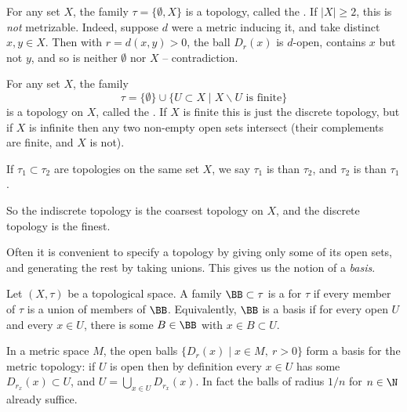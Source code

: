 \begin{example}
    For any set $X$, the family $\tau = \{\emptyset, X\}$ is a topology, called the . If $|X| \geq 2$, this is \emph{not} metrizable. Indeed, suppose $d$ were a metric inducing it, and take distinct $x, y \in X$. Then with $r = d(x, y) > 0$, the ball $D_r(x)$ is $d$-open, contains $x$ but not $y$, and so is neither $\emptyset$ nor $X$ -- contradiction.
\end{example}

\begin{example}
    For any set $X$, the family
    $$
    \tau = \{\emptyset\} \cup \{U \subset X \mid X \backslash U \text{ is finite}\}
    $$
    is a topology on $X$, called the . If $X$ is finite this is just the discrete topology, but if $X$ is infinite then any two non-empty open sets intersect (their complements are finite, and $X$ is not).
\end{example}

\begin{definition}
    If $\tau_1 \subset \tau_2$ are topologies on the same set $X$, we say $\tau_1$ is  than $\tau_2$, and $\tau_2$ is  than $\tau_1$.
\end{definition}

So the indiscrete topology is the coarsest topology on $X$, and the discrete topology is the finest.

Often it is convenient to specify a topology by giving only some of its open sets, and generating the rest by taking unions. This gives us the notion of a \emph{basis}.

\begin{definition}[Basis]
    Let $(X, \tau)$ be a topological space. A family $\BB \subset \tau$ is a  for $\tau$ if every member of $\tau$ is a union of members of $\BB$. Equivalently, $\BB$ is a basis if for every open $U$ and every $x \in U$, there is some $B \in \BB$ with $x \in B \subset U$.
\end{definition}

\begin{example}
    In a metric space $M$, the open balls $\{D_r(x) \mid x \in M,\ r > 0\}$ form a basis for the metric topology: if $U$ is open then by definition every $x \in U$ has some $D_{r_x}(x) \subset U$, and $U = \bigcup_{x \in U} D_{r_x}(x)$. In fact the balls of radius $1/n$ for $n \in \N$ already suffice.
\end{example}

